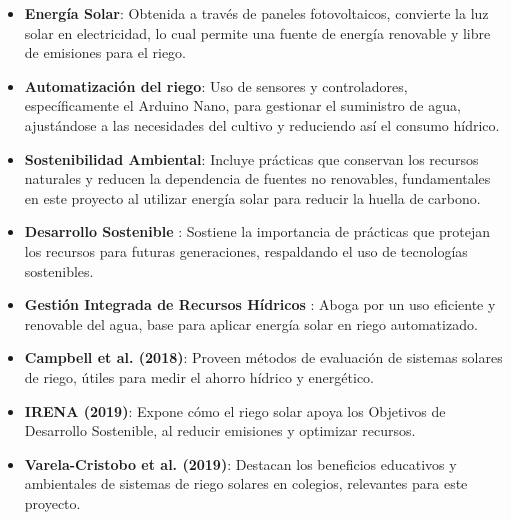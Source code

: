 \documentclass[12pt]{article}
\begin{document}
\begin{itemize}
      \item \textbf{Energía Solar}: Obtenida a través de paneles fotovoltaicos, convierte la luz solar en electricidad, lo cual permite una fuente de energía renovable y libre de emisiones para el riego.
      \item \textbf{Automatización del riego}: Uso de sensores y controladores, específicamente el Arduino Nano, para gestionar el suministro de agua, ajustándose a las necesidades del cultivo y reduciendo así el consumo hídrico.
      \item \textbf{Sostenibilidad Ambiental}: Incluye prácticas que conservan los recursos naturales y reducen la dependencia de fuentes no renovables, fundamentales en este proyecto al utilizar energía solar para reducir la huella de carbono.
\end{itemize}

\begin{itemize}
      \item \textbf{Desarrollo Sostenible} \cite{Brundtland1987}: Sostiene la importancia de prácticas que protejan los recursos para futuras generaciones, respaldando el uso de tecnologías sostenibles.
      \item \textbf{Gestión Integrada de Recursos Hídricos} \cite{GWP2000}: Aboga por un uso eficiente y renovable del agua, base para aplicar energía solar en riego automatizado.
      \item \textbf{Campbell et al. (2018)}: Proveen métodos de evaluación de sistemas solares de riego, útiles para medir el ahorro hídrico y energético.
      \item \textbf{IRENA (2019)}: Expone cómo el riego solar apoya los Objetivos de Desarrollo Sostenible, al reducir emisiones y optimizar recursos.
      \item \textbf{Varela-Cristobo et al. (2019)}: Destacan los beneficios educativos y ambientales de sistemas de riego solares en colegios, relevantes para este proyecto.
\end{itemize}
\end{document}
